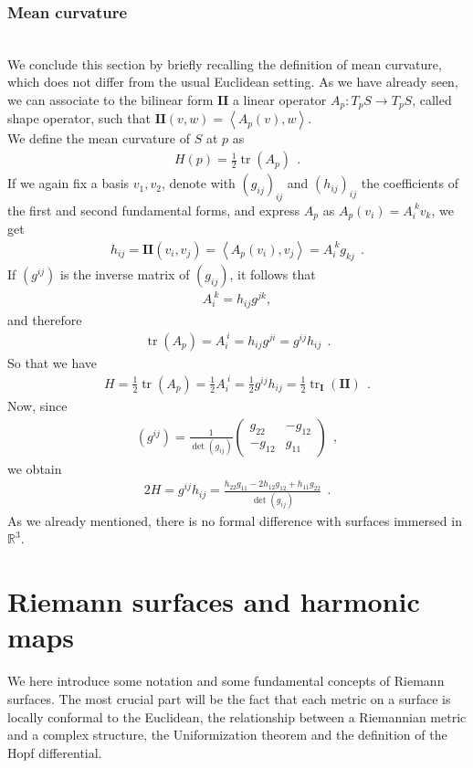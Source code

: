 \documentclass[a4paper,11pt,openright,twoside]{book}
\newcommand{\R}{\mathbb{R}}
\newcommand{\tr}{\operatorname{tr}}
\newcommand{\I}{\mathbf{I}}
\newcommand{\II}{\mathbf{I\!I}}
\newcommand{\1}{\mathds{1}}
\theoremstyle{plain}
\theoremstyle{definition}
\theoremstyle{remark}
\begin{document}
\subsection{Mean curvature}\mbox{}\\
We conclude this section by briefly recalling the definition of mean curvature, which does not differ from the usual Euclidean setting.
As we have already seen, we can associate to the bilinear form $\II$ a linear operator $A_p:T_pS\to T_pS$, called shape operator, such that $\II(v,w)=\left<A_p(v),w\right>$.\\
We define the mean curvature of $S$ at $p$ as
\begin{align*}
	H(p)=\frac{1}{2}\tr(A_p)
	\ \ .
\end{align*}
If we again fix a basis $v_1,v_2$, denote with $(g_{ij})_{ij}$ and $(h_{ij})_{ij}$ the coefficients of the first and second fundamental forms, and express $A_p$ as $A_p(v_i)=A_i^{\ k}v_k$, we get
\begin{align*}
	h_{ij}
	=\II(v_i,v_j)
	=\left<A_p(v_i),v_j\right>
	=A_i^{\ k}g_{kj}
	\ \ .
\end{align*}
If $(g^{ij})$ is the inverse matrix of $(g_{ij})$, it follows that
\begin{align*}
	A_i^{\ k}=h_{ij}g^{jk},
\end{align*}
and therefore
\begin{align*}
	\tr(A_p)=A_i^{\ i}=h_{ij}g^{ji}=g^{ij}h_{ij}
	\ \ .
\end{align*}
So that we have
\begin{align*}
	H=\frac{1}{2}\tr(A_p)=\frac{1}{2}A^{\ i}_i	= \frac{1}{2} g^{ij}h_{ij}=\frac{1}{2}\tr_{\I}(\II)
	\ \ .
\end{align*}
Now, since
\begin{align*}
	(g^{ij})
	=
	\frac{1}{\det(g_{ij})}
	\begin{pmatrix}
		g_{22} & -g_{12}\\
		-g_{12} & g_{11}
	\end{pmatrix}
	\ \ ,
\end{align*}
we obtain
\begin{align*}
	2H
	=
	g^{ij}h_{ij}
	=
	\frac{h_{22}g_{11}-2h_{12}g_{12}+h_{11}g_{22}}{\det(g_{ij})}
	\ \ .
\end{align*}
As we already mentioned, there is no formal difference with surfaces immersed in $\R^3$.
\chapter{Riemann surfaces and harmonic maps}
We here introduce some notation and some fundamental concepts of Riemann surfaces. The most crucial part will be the fact that each metric on a surface is locally conformal to the Euclidean, the relationship between a Riemannian metric and a complex structure, the Uniformization theorem and the definition of the Hopf differential.
\end{document}
